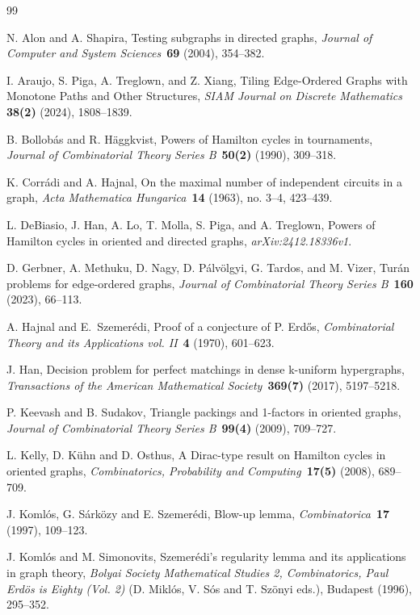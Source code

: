 \documentclass[11pt]{amsart}
\begin{document}
\begin{thebibliography}{99}

 N. Alon and A. Shapira, Testing subgraphs in directed graphs, \emph{Journal of Computer and System Sciences}~{\bf 69} (2004), 354--382.

 I. Araujo, S. Piga, A. Treglown, and Z. Xiang, Tiling Edge-Ordered Graphs with Monotone Paths and Other Structures, \emph{SIAM Journal on Discrete Mathematics} {\bf 38(2)} (2024),  1808--1839.

 B. Bollob\'as and R. H\"aggkvist, Powers of Hamilton cycles in tournaments, \emph{Journal of Combinatorial Theory Series B}~{\bf 50(2)} (1990), 309--318.

 K. Corr\'adi and A. Hajnal, On the maximal number of independent circuits in a graph, \emph{Acta Mathematica Hungarica}~{\bf 14} (1963), no. 3--4, 423--439.

 L. DeBiasio, J. Han, A. Lo, T. Molla, S. Piga, and A. Treglown, Powers of Hamilton cycles in oriented and directed graphs, \emph{arXiv:2412.18336v1}.

 D. Gerbner, A. Methuku, D. Nagy, D. P\'alv\"olgyi, G. Tardos, and M. Vizer, Tur\'an problems for edge-ordered graphs, \emph{Journal of Combinatorial Theory Series B}~{\bf 160} (2023), 66--113.

 A. Hajnal and E.~Szemer\'{e}di, Proof of a conjecture of P. Erd\H{o}s,
\emph{Combinatorial Theory and its Applications vol. II}~{\bf 4} 
(1970), 601--623.

 J. Han, Decision problem for perfect matchings in dense k-uniform hypergraphs, \emph{Transactions of the American Mathematical Society}~{\bf 369(7)} (2017), 5197--5218.

  P. Keevash and B. Sudakov, Triangle packings and 1-factors in oriented graphs, \emph{Journal of Combinatorial Theory Series B}~{\bf 99(4)}
(2009), 709--727. 

 L. Kelly, D. K\"uhn and D. Osthus, A Dirac-type result on Hamilton cycles in oriented graphs, \emph{Combinatorics, Probability and Computing}~{\bf 17(5)} (2008), 689--709.

 J. Koml\'os, G. S\'ark\"ozy and E. Szemer\'edi, Blow-up lemma, \emph{Combinatorica}~{\bf 17} (1997), 109--123.

 J. Koml\'os and M. Simonovits, Szemer\'edi’s regularity lemma and its applications in graph theory, \emph{Bolyai Society Mathematical Studies 2, Combinatorics, Paul Erd\"os is Eighty (Vol. 2)} (D. Mikl\'os, V. S\'os and T. Sz\"onyi eds.), Budapest (1996), 295--352.


\end{thebibliography}
\end{document}

